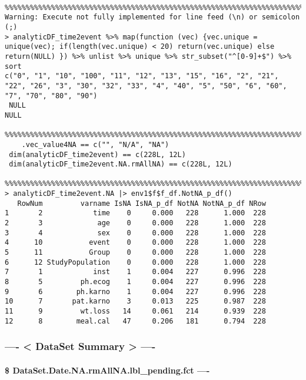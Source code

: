 \documentclass[
]{article}
\begin{document}
\begin{verbatim}
    %%%%%%%%%%%%%%%%%%%%%%%%%%%%%%%%%%%%%%%%%%%%%%%%%%%%%%%%%%%%%%%%%%%%%%%%    
Warning: Execute not fully implemented for line feed (\n) or semicolon (;)
> analyticDF_time2event %>% map(function (vec) {vec.unique = unique(vec); if(length(vec.unique) < 20) return(vec.unique) else return(NULL) }) %>% unlist %>% unique %>% str_subset("^[0-9]+$") %>% sort  
c("0", "1", "10", "100", "11", "12", "13", "15", "16", "2", "21", "22", "26", "3", "30", "32", "33", "4", "40", "5", "50", "6", "60", "7", "70", "80", "90")  
 NULL
NULL
    %%%%%%%%%%%%%%%%%%%%%%%%%%%%%%%%%%%%%%%%%%%%%%%%%%%%%%%%%%%%%%%%%%%%%%%%    
    .vec_value4NA == c("", "N/A", "NA")  
 dim(analyticDF_time2event) == c(228L, 12L)  
 dim(analyticDF_time2event.NA.rmAllNA) == c(228L, 12L)  
    %%%%%%%%%%%%%%%%%%%%%%%%%%%%%%%%%%%%%%%%%%%%%%%%%%%%%%%%%%%%%%%%%%%%%%%%    
> analyticDF_time2event.NA |> env1$f$f_df.NotNA_p_df()  
   RowNum         varname IsNA IsNA_p_df NotNA NotNA_p_df NRow
1       2            time    0     0.000   228      1.000  228
2       3             age    0     0.000   228      1.000  228
3       4             sex    0     0.000   228      1.000  228
4      10           event    0     0.000   228      1.000  228
5      11           Group    0     0.000   228      1.000  228
6      12 StudyPopulation    0     0.000   228      1.000  228
7       1            inst    1     0.004   227      0.996  228
8       5         ph.ecog    1     0.004   227      0.996  228
9       6        ph.karno    1     0.004   227      0.996  228
10      7       pat.karno    3     0.013   225      0.987  228
11      9         wt.loss   14     0.061   214      0.939  228
12      8        meal.cal   47     0.206   181      0.794  228
\end{verbatim}

\hypertarget{dataset-summary--}{%
\subsubsection{---- \textless{} DataSet Summary \textgreater{}
----}\label{dataset-summary--}}

\hypertarget{dataset.date.na.rmallna.fct--}{%
\paragraph{\$ DataSet.Date.NA.rmAllNA.lbl_pending.fct
----}\label{dataset.date.na.rmallna.fct--}}
\end{document}
